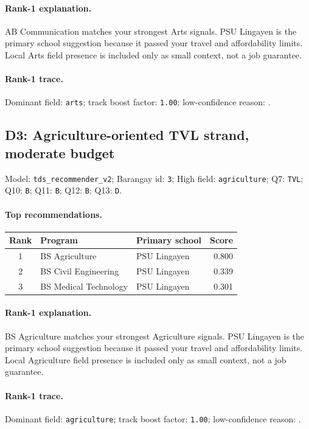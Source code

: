 \paragraph{Rank-1 explanation.}
AB Communication matches your strongest Arts signals. PSU Lingayen is the primary school suggestion because it passed your travel and affordability limits. Local Arts field presence is included only as small context, not a job guarantee.

\paragraph{Rank-1 trace.}
Dominant field: \texttt{arts}; track boost factor: \texttt{1.00}; low-confidence reason: \texttt{}.


\subsection*{D3: Agriculture-oriented TVL strand, moderate budget}
\noindent Model: \texttt{tds\_recommender\_v2}; Barangay id: \texttt{3}; High field: \texttt{agriculture}; Q7: \texttt{TVL}; Q10: \texttt{B}; Q11: \texttt{B}; Q12: \texttt{B}; Q13: \texttt{D}.

\paragraph{Top recommendations.}
\begingroup\small\setlength{\tabcolsep}{6pt}
\noindent\begin{tabular}{@{}c p{4.4cm} p{4.4cm} r@{}}
\toprule
Rank & Program & Primary school & Score \\
\midrule
1 & BS Agriculture & PSU Lingayen & 0.800 \\
2 & BS Civil Engineering & PSU Lingayen & 0.339 \\
3 & BS Medical Technology & PSU Lingayen & 0.301 \\
\bottomrule
\end{tabular}\endgroup

\paragraph{Rank-1 explanation.}
BS Agriculture matches your strongest Agriculture signals. PSU Lingayen is the primary school suggestion because it passed your travel and affordability limits. Local Agriculture field presence is included only as small context, not a job guarantee.

\paragraph{Rank-1 trace.}
Dominant field: \texttt{agriculture}; track boost factor: \texttt{1.00}; low-confidence reason: \texttt{}.


